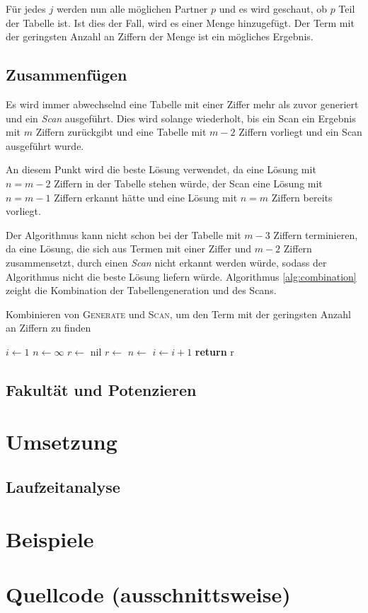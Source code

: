 \documentclass[a4paper,10pt,ngerman]{scrartcl}
\begin{document}
Für jedes $j$ werden nun alle möglichen Partner $p$ und es wird geschaut, ob $p$ Teil der Tabelle ist.
Ist dies der Fall, wird es einer Menge hinzugefügt.
Der Term mit der geringsten Anzahl an Ziffern der Menge ist ein mögliches Ergebnis.

\subsection{Zusammenfügen}
Es wird immer abwechselnd eine Tabelle mit einer Ziffer mehr als zuvor generiert und ein \textit{Scan} ausgeführt.
Dies wird solange wiederholt, bis ein Scan ein Ergebnis mit $m$ Ziffern zurückgibt und eine Tabelle mit $m-2$ Ziffern vorliegt und ein Scan ausgeführt wurde.

An diesem Punkt wird die beste Lösung verwendet, da eine Lösung mit $n=m-2$ Ziffern in der Tabelle stehen würde, der Scan eine Lösung mit $n=m-1$ Ziffern erkannt hätte und eine Lösung mit $n=m$ Ziffern bereits vorliegt.

Der Algorithmus kann nicht schon bei der Tabelle mit $m-3$ Ziffern terminieren, da eine Lösung, die sich aus Termen mit einer Ziffer und $m-2$ Ziffern zusammensetzt, durch einen \textit{Scan} nicht erkannt werden würde, sodass der Algorithmus nicht die beste Lösung liefern würde.
Algorithmus \ref{alg:combination} zeight die Kombination der Tabellengeneration und des Scans.


\begin{algorithm}
  \caption{Kombinieren von \textsc{Generate} und \textsc{Scan}, um den Term mit der geringsten Anzahl an Ziffern zu finden}
  \begin{algorithmic}[1]
    \State $i \gets 1$
    \State $n \gets \infty$
    \State $r \gets$ nil
        \State {}
        \State $r \gets$ 
          \State $n \gets$ 
        \EndIf
        \State $i \gets i+1$
    \EndWhile
    \State \textbf{return} r
  \end{algorithmic}
  \label{alg:combination}
\end{algorithm}

\subsection{Fakultät und Potenzieren}


\section{Umsetzung}

\subsection{Laufzeitanalyse}

\section{Beispiele}

\section{Quellcode (ausschnittsweise)}

\listoftodos
\end{document}
